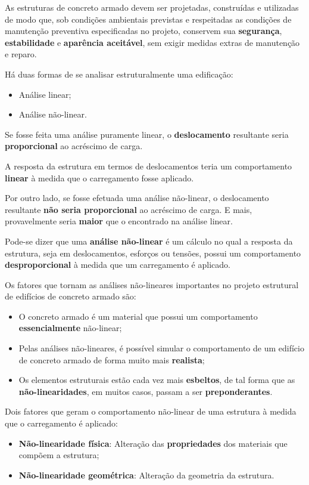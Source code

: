 As estruturas de concreto armado devem ser projetadas, construídas e utilizadas de modo que, sob condições ambientais previstas e respeitadas as condições de manutenção preventiva especificadas no projeto, conservem sua \textbf{segurança}, \textbf{estabilidade} e \textbf{aparência aceitável}, sem exigir medidas extras de manutenção e reparo.

Há duas formas de se analisar estruturalmente uma edificação:

\begin{itemize}
	\item Análise linear;
	\item Análise não-linear.
\end{itemize}

Se fosse feita uma análise puramente linear, o \textbf{deslocamento} resultante seria \textbf{proporcional} ao acréscimo de carga.

A resposta da estrutura em termos de deslocamentos teria um comportamento \textbf{linear} à medida que o carregamento fosse aplicado.

Por outro lado, se fosse efetuada uma análise não-linear, o deslocamento resultante \textbf{não seria proporcional} ao acréscimo de carga. E mais, provavelmente seria \textbf{maior} que o encontrado na análise linear.

Pode-se dizer que uma \textbf{análise não-linear} é um cálculo no qual a resposta da estrutura, seja em deslocamentos, esforços ou tensões, possui um comportamento \textbf{desproporcional} à medida que um carregamento é aplicado.

Os fatores que tornam as análises não-lineares importantes no projeto estrutural de edifícios de concreto armado são:

\begin{itemize}
	\item O concreto armado é um material que possui um comportamento \textbf{essencialmente} não-linear;
	\item Pelas análises não-lineares, é possível simular o comportamento de um edifício de concreto armado de forma muito mais \textbf{realista};
	\item Os elementos estruturais estão cada vez mais \textbf{esbeltos}, de tal forma que as \textbf{não-linearidades}, em muitos casos, passam a ser \textbf{preponderantes}.
\end{itemize}

Dois fatores que geram o comportamento não-linear de uma estrutura à medida que o carregamento é aplicado:

\begin{itemize}
	\item \textbf{Não-linearidade física}: Alteração das \textbf{propriedades} dos materiais que compõem a estrutura;
	\item \textbf{Não-linearidade geométrica}: Alteração da geometria da estrutura.
\end{itemize}